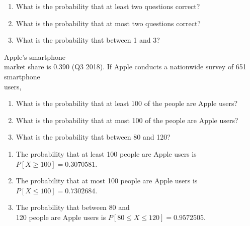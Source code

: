 \documentclass[11pt]{book}\usepackage[]{graphicx}\usepackage[]{color}
\begin{document}
\begin{exercises}
\begin{exercise}
\begin{enumerate}
\item What is the probability that at least two questions correct?
\item What is the probability that at most two questions correct?
\item What is the probability that between 1 and 3?
\end{enumerate}
	\end{exercise}
%
%

  \begin{exercise} %

Apple's smartphone \\ market  share is  0.390 (Q3 2018). If Apple conducts a nationwide survey of 651 smartphone \\ users,

\begin{enumerate}
\item What is the probability that at least 100 of the people are Apple users?
\item What is the probability that at most 100 of the people are Apple users?
\item What is the probability that between 80 and 120?
\end{enumerate}

	\end{exercise}
	\begin{solution}  %


\begin{enumerate}
\item The probability that at least 100 people are Apple users is $P[X \ge 100] = 0.3070581$.
\item The probability that at most 100 people are Apple users is $P[X \le 100] = 0.7302684$.
\item The probability that between 80 and \\ 120 people are Apple users is $P[ 80 \le X \le 120] = 0.9572505$.
\end{enumerate}
	\end{solution}


\end{exercises}
\end{document}
